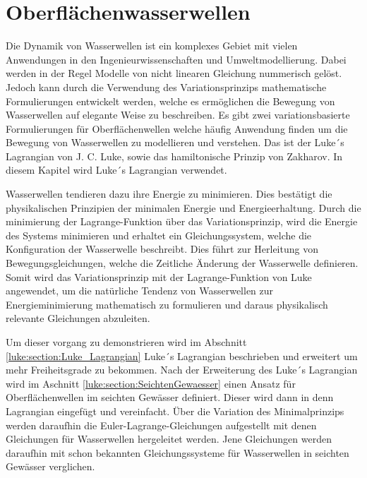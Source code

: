 %
%
%
%
\chapter{Oberflächenwasserwellen\label{chapter:luke}}
\begin{refsection}

Die Dynamik von Wasserwellen ist ein komplexes Gebiet mit vielen Anwendungen in den Ingenieurwissenschaften und Umweltmodellierung.
Dabei werden in der Regel Modelle von nicht linearen Gleichung nummerisch gelöst.
Jedoch kann durch die Verwendung des Variationsprinzips mathematische Formulierungen entwickelt werden, welche es ermöglichen die Bewegung von Wasserwellen auf elegante Weise zu beschreiben.
Es gibt zwei variationsbasierte Formulierungen für Oberflächenwellen welche häufig Anwendung finden um die Bewegung von Wasserwellen zu modellieren und verstehen.
Das ist der Luke´s Lagrangian von J. C. Luke, sowie das hamiltonische Prinzip von Zakharov.
In diesem Kapitel wird Luke´s Lagrangian verwendet.

Wasserwellen tendieren dazu ihre Energie zu minimieren.
Dies bestätigt die physikalischen Prinzipien der minimalen Energie und Energieerhaltung.
Durch die minimierung der Lagrange-Funktion über das Variationsprinzip, wird die Energie des Systems minimieren und erhaltet ein Gleichungssystem, welche die Konfiguration der Wasserwelle beschreibt.
Dies führt zur Herleitung von Bewegungsgleichungen, welche die Zeitliche Änderung der Wasserwelle definieren.
Somit wird das Variationsprinzip mit der Lagrange-Funktion von Luke angewendet, um die natürliche Tendenz von Wasserwellen zur Energieminimierung mathematisch zu formulieren und daraus physikalisch relevante Gleichungen abzuleiten.

Um dieser vorgang zu demonstrieren wird im Abschnitt \ref{luke:section:Luke_Lagrangian} Luke´s Lagrangian beschrieben und erweitert um mehr Freiheitsgrade zu bekommen.
Nach der Erweiterung des Luke´s Lagrangian wird im Aschnitt \ref{luke:section:SeichtenGewaesser} einen Ansatz für Oberflächenwellen im seichten Gewässer definiert. Dieser wird dann in denn Lagrangian eingefügt und vereinfacht. Über die Variation des Minimalprinzips werden daraufhin die Euler-Lagrange-Gleichungen aufgestellt mit denen Gleichungen für Wasserwellen hergeleitet werden. Jene Gleichungen werden daraufhin mit schon bekannten Gleichungssysteme für Wasserwellen in seichten Gewässer verglichen.




\printbibliography[heading=subbibliography]
\end{refsection}
